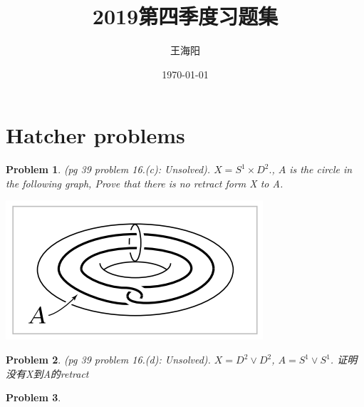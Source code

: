\documentclass{article}
\newtheorem{problem}{Problem}
\begin{document}
\title{2019第四季度习题集}
\author{王海阳}
\date{\today}
\maketitle
\tableofcontents

    \section{Hatcher problems}
        \begin{problem} 
            (pg 39 problem 16.(c): Unsolved). %
            \(X = S^1\times D^2.\), \(A\) is the circle in the following graph,
            Prove that there is no retract form X to A. 
            \begin{center}
                \includegraphics{hatcher习题截图.png}
            \end{center}
        \end{problem}

        \begin{problem}
            (pg 39 problem 16.(d): Unsolved). %
            \(X = D^2 \vee D^2\), \(A = S^1 \vee S^1\). 证明没有X到A的retract
        \end{problem}

        \begin{problem}
            
        \end{problem}








\end{document}
